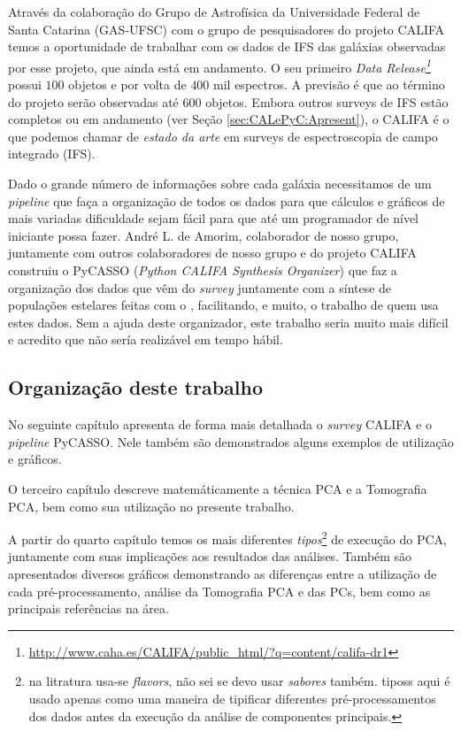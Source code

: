 Através da colaboração do Grupo de Astrofísica da Universidade Federal de Santa
Catarina (GAS-UFSC) com o grupo de pesquisadores do projeto CALIFA temos a
oportunidade de trabalhar com os dados de IFS das galáxias observadas por esse
projeto, que ainda está em andamento. O seu primeiro {\em Data
Release\footnote{\url{http://www.caha.es/CALIFA/public_html/?q=content/califa-dr1}}}
\citep[][DR1]{Husemann2013} possui $100$ objetos e por volta de $400$ mil
espectros. A previsão é que ao término do projeto serão observadas até $600$
objetos. Embora outros surveys de IFS estão completos ou em andamento (ver Seção
\ref{sec:CALePyC:Apresent}), o CALIFA é o que podemos chamar de {\em estado da
arte} em surveys de espectroscopia de campo integrado (IFS).

Dado o grande número de informações sobre cada galáxia necessitamos de um {\em
pipeline} que faça a organização de todos os dados para que cálculos e gráficos
de mais variadas dificuldade sejam fácil para que até um programador de nível
iniciante possa fazer. André L. de Amorim, colaborador de nosso grupo,
juntamente com outros colaboradores de nosso grupo e do projeto CALIFA construiu
o PyCASSO ({\em Python CALIFA \starlight Synthesis Organizer})
\citep[][ cap. 4]{CidFernandes2013I} que faz a organização dos dados que vêm
do {\em survey} juntamente com a síntese de populações estelares feitas com o
\starlight, facilitando, e muito, o trabalho de quem usa estes dados. Sem a
ajuda deste organizador, este trabalho seria muito mais difícil e acredito que
não sería realizável em tempo hábil.

\subsection{Organização deste trabalho}

No seguinte capítulo apresenta de forma mais detalhada o {\em survey} CALIFA e o
{\em pipeline} PyCASSO. Nele também são demonstrados alguns exemplos de
utilização e gráficos.

O terceiro capítulo descreve matemáticamente a técnica PCA e a Tomografia PCA,
bem como sua utilização no presente trabalho. 

A partir do quarto capítulo temos os mais diferentes {\em tipos}\footnote{\ojo
na litratura usa-se {\em flavors}, não sei se devo usar {\em sabores} também.
tiposs aqui é usado apenas como uma maneira de tipificar diferentes
pré-processamentos dos dados antes da execução da análise de componentes
principais.} de execução do PCA, juntamente com suas implicações aos resultados
das análises. Também são apresentados diversos gráficos demonstrando as
diferenças entre a utilização de cada pré-processamento, análise da
Tomografia PCA e das PCs, bem como as principais referências na área.

